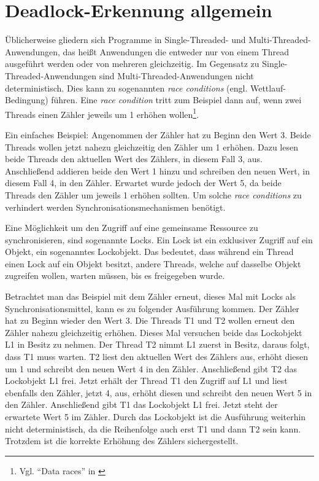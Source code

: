 \section{Deadlock-Erkennung allgemein}
\label{section:Deadlock-Erkennung allgemein}
Üblicherweise gliedern sich Programme in  Single-Threaded- und
Multi-Threaded-Anwendungen, das heißt Anwendungen die entweder nur von einem
Thread ausgeführt werden oder von mehreren gleichzeitig. Im Gegensatz zu
Single-Threaded-Anwendungen sind Multi-Threaded-Anwendungen nicht
deterministisch. Dies kann zu sogenannten \emph{race conditions} (engl.
Wettlauf-Bedingung) führen. Eine \emph{race condition} tritt zum Beispiel dann
auf, wenn zwei Threads einen Zähler jeweils um 1 erhöhen wollen\footnote{Vgl.
"`Data races"' in \autocite[70]{netzer1992race}}.

Ein einfaches Beispiel: Angenommen der Zähler hat zu Beginn den Wert 3. Beide
Threads wollen jetzt nahezu gleichzeitig den Zähler um 1 erhöhen. Dazu lesen
beide Threads den aktuellen Wert des Zählers, in diesem Fall 3, aus.
Anschließend addieren beide den Wert 1 hinzu und schreiben den neuen Wert, in
diesem Fall 4, in den Zähler. Erwartet wurde jedoch der Wert 5, da beide Threads
den Zähler um jeweils 1 erhöhen sollten. Um solche \emph{race conditions} zu
verhindert werden Synchronisationsmechanismen benötigt.

Eine Möglichkeit um den Zugriff auf eine gemeinsame Ressource zu
synchronisieren, sind sogenannte Locks. Ein Lock ist ein exklusiver Zugriff auf
ein Objekt, ein sogenanntes Lockobjekt. Das bedeutet, dass während ein Thread
einen Lock auf ein Objekt besitzt, andere Threads, welche auf dasselbe Objekt
zugreifen wollen, warten müssen, bis es freigegeben wurde.

Betrachtet man das Beispiel mit dem Zähler erneut, dieses Mal mit Locks als
Synchronisationsmittel, kann es zu folgender Ausführung kommen. Der Zähler hat
zu Beginn wieder den Wert 3. Die Threads \textrm{T1} und \textrm{T2} wollen
erneut den Zähler nahezu gleichzeitig erhöhen. Dieses Mal versuchen beide das
Lockobjekt \textrm{L1} in Besitz zu nehmen. Der Thread \textrm{T2} nimmt
\textrm{L1} zuerst in Besitz, daraus folgt, dass \textrm{T1} muss warten. \textrm{T2}
liest den aktuellen Wert des Zählers aus, erhöht diesen um 1 und schreibt den
neuen Wert 4 in den Zähler. Anschließend gibt \textrm{T2} das Lockobjekt
\textrm{L1} frei. Jetzt erhält der Thread \textrm{T1} den Zugriff auf
\textrm{L1} und liest ebenfalls den Zähler, jetzt 4, aus, erhöht diesen und
schreibt den neuen Wert 5 in den Zähler. Anschließend gibt \textrm{T1} das
Lockobjekt \textrm{L1} frei. Jetzt steht der erwartete Wert 5 im Zähler. Durch
das Lockobjekt ist die Ausführung weiterhin nicht deterministisch, da die
Reihenfolge auch erst \textrm{T1} und dann \textrm{T2} sein kann. Trotzdem ist
die korrekte Erhöhung des Zählers sichergestellt.

